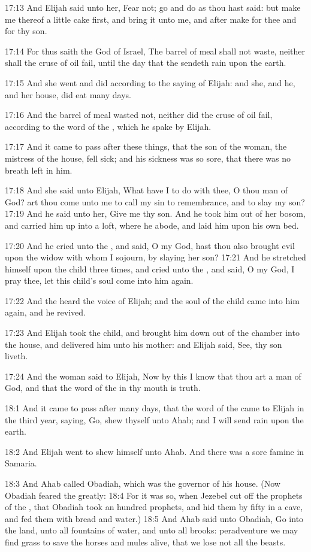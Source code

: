 17:13 And Elijah said unto her, Fear not; go and do as thou hast said: but make me thereof a little cake first, and bring it unto me, and after make for thee and for thy son.

17:14 For thus saith the \LORD God of Israel, The barrel of meal shall not waste, neither shall the cruse of oil fail, until the day that the \LORD sendeth rain upon the earth.

17:15 And she went and did according to the saying of Elijah: and she, and he, and her house, did eat many days.

17:16 And the barrel of meal wasted not, neither did the cruse of oil fail, according to the word of the \LORD, which he spake by Elijah.

17:17 And it came to pass after these things, that the son of the woman, the mistress of the house, fell sick; and his sickness was so sore, that there was no breath left in him.

17:18 And she said unto Elijah, What have I to do with thee, O thou man of God? art thou come unto me to call my sin to remembrance, and to slay my son?  17:19 And he said unto her, Give me thy son. And he took him out of her bosom, and carried him up into a loft, where he abode, and laid him upon his own bed.

17:20 And he cried unto the \LORD, and said, O \LORD my God, hast thou also brought evil upon the widow with whom I sojourn, by slaying her son?  17:21 And he stretched himself upon the child three times, and cried unto the \LORD, and said, O \LORD my God, I pray thee, let this child's soul come into him again.

17:22 And the \LORD heard the voice of Elijah; and the soul of the child came into him again, and he revived.

17:23 And Elijah took the child, and brought him down out of the chamber into the house, and delivered him unto his mother: and Elijah said, See, thy son liveth.

17:24 And the woman said to Elijah, Now by this I know that thou art a man of God, and that the word of the \LORD in thy mouth is truth.

18:1 And it came to pass after many days, that the word of the \LORD came to Elijah in the third year, saying, Go, shew thyself unto Ahab; and I will send rain upon the earth.

18:2 And Elijah went to shew himself unto Ahab. And there was a sore famine in Samaria.

18:3 And Ahab called Obadiah, which was the governor of his house.  (Now Obadiah feared the \LORD greatly: 18:4 For it was so, when Jezebel cut off the prophets of the \LORD, that Obadiah took an hundred prophets, and hid them by fifty in a cave, and fed them with bread and water.)  18:5 And Ahab said unto Obadiah, Go into the land, unto all fountains of water, and unto all brooks: peradventure we may find grass to save the horses and mules alive, that we lose not all the beasts.

